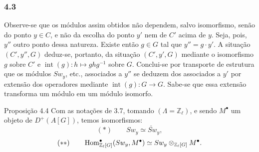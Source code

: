 \subsubsection*{4.3}

Observe-se que os módulos assim obtidos não dependem, salvo isomorfismo, senão do ponto $y\in C$, e não da escolha do ponto $y'$ nem de $C'$ acima de $y$. Seja, pois, $y''$ outro ponto dessa natureza. Existe então $g\in G$ tal que $y''=g\cdot y'$. A situação $(C',y'',G)$ deduz-se, portanto, da situação $(C',y',G)$ mediante o isomorfismo $g$ sobre $C'$ e $\operatorname{int}(g):h\mapsto ghg^{-1}$ sobre $G$. Conclui-se por transporte de estrutura que os módulos $Sw_y$, etc., associados a $y''$ se deduzem dos associados a $y'$ por extensão dos operadores mediante $\operatorname{int}(g):G\to G$. Sabe-se que essa extensão transforma um módulo em um módulo isomorfo.

\begin{statement}{Proposição 4.4}
Com as notações de 3.7, tomando $(\Lambda=\mathbb Z_\ell)$, e sendo $M^\bullet$ um objeto de $D^+(A[G])$, temos isomorfismos:
\[
(*)\qquad Sw_y\simeq \check{Sw}_y,
\]
\[
(**)\qquad
\operatorname{Hom}^\bullet_{\mathbb Z_\ell[G]}(Sw_y,M^\bullet)
\simeq Sw_y\otimes_{\mathbb Z_\ell[G]}M^\bullet.
\]
\end{statement}
